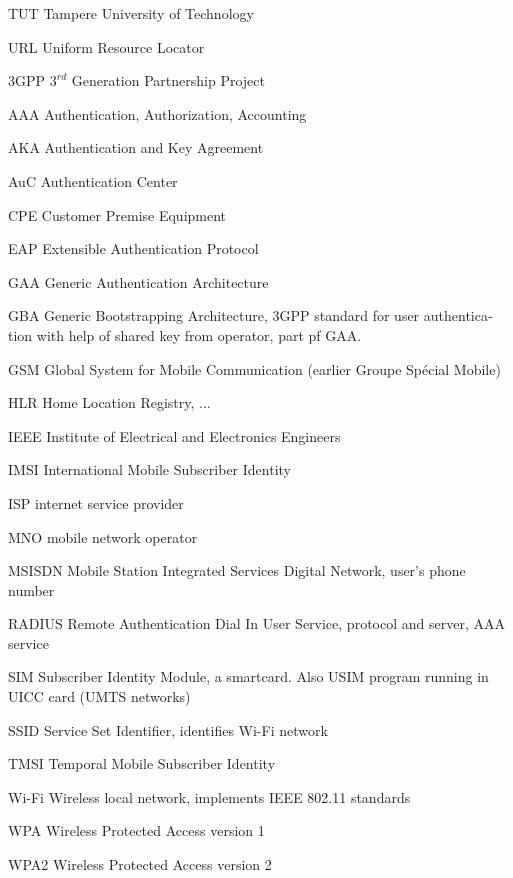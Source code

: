 \documentclass[12pt,a4paper,english]{tutthesis}
\begin{document}
\begin{otherlanguage}{english}
\begin{termlist}
\item [TUT]    Tampere University of Technology
\item [URL]    Uniform Resource Locator
\item[3GPP] $3^{rd}$ Generation Partnership Project
\item[AAA] Authentication, Authorization, Accounting
\item[AKA] Authentication and Key Agreement %
\item[AuC] Authentication Center
\item[CPE] Customer Premise Equipment %
\item[EAP] Extensible Authentication Protocol %
\item[GAA] Generic Authentication Architecture %
\item[GBA] Generic Bootstrapping Architecture, 3GPP standard for user authentication with help of shared key from operator, part pf GAA.
\item[GSM] Global System for Mobile Communication (earlier Groupe Spécial Mobile)
\item[HLR] Home Location Registry, ...
\item[IEEE] Institute of Electrical and Electronics Engineers
\item[IMSI] International Mobile Subscriber Identity
\item[ISP] internet service provider
\item[MNO] mobile network operator
\item[MSISDN] Mobile Station Integrated Services Digital Network, user's phone number
\item[RADIUS] Remote Authentication Dial In User Service, protocol and server,  AAA service 
\item[SIM]  Subscriber Identity Module, a smartcard. Also USIM program running in UICC card (UMTS networks)
\item[SSID] Service Set Identifier, identifies Wi-Fi network
\item[TMSI] Temporal Mobile Subscriber Identity
\item[Wi-Fi] Wireless local network, implements IEEE 802.11 standards
\item[WPA] Wireless Protected Access version 1
\item[WPA2] Wireless Protected Access version 2
\end{termlist} 



\end{otherlanguage}
\end{document}
